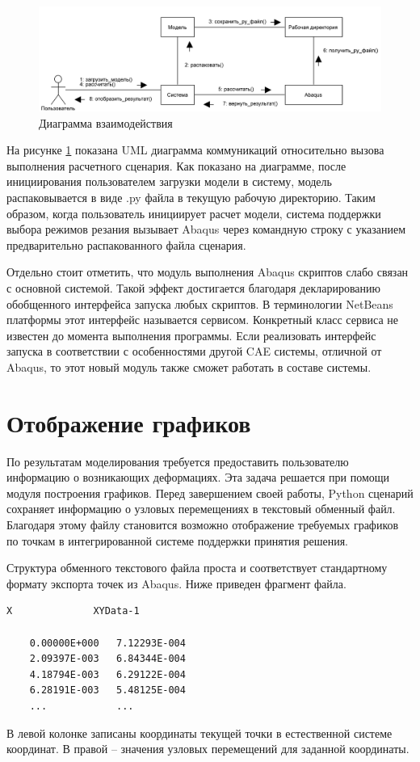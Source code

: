 \documentclass[14pt,oneside,final]{extreport}
\begin{document}
	\begin{figure}[!h]
		\begin{center}
			\includegraphics[width=1\textwidth]{img/commun-diagram} 
		\end{center}
		\caption{Диаграмма взаимодействия}
		\label{fig:commun-diagram}
	\end{figure}
	
	На рисунке \ref{fig:commun-diagram} показана UML диаграмма коммуникаций относительно вызова выполнения расчетного сценария. Как показано на диаграмме, после инициирования пользователем загрузки модели в систему, модель распаковывается в виде .py файла в текущую рабочую директорию. Таким образом, когда пользователь инициирует расчет модели, система поддержки выбора режимов резания вызывает Abaqus через командную строку с указанием предварительно распакованного файла сценария.
	
	Отдельно стоит отметить, что модуль выполнения Abaqus скриптов слабо связан с основной системой. Такой эффект достигается благодаря декларированию обобщенного интерфейса запуска любых скриптов. В терминологии NetBeans платформы этот интерфейс называется сервисом. Конкретный класс сервиса не известен до момента выполнения программы. Если реализовать интерфейс запуска в соответствии с особенностями другой CAE системы, отличной от Abaqus, то этот новый модуль также сможет работать в составе системы. 
	
	
	\section{Отображение графиков}	
	По результатам моделирования требуется предоставить пользователю информацию о возникающих деформациях. Эта задача решается при помощи модуля построения графиков. Перед завершением своей работы, Python сценарий сохраняет информацию о узловых перемещениях в текстовый обменный файл. Благодаря этому файлу становится возможно отображение требуемых графиков по точкам в интегрированной системе поддержки принятия решения.
	
	Структура обменного текстового файла проста и соответствует стандартному формату экспорта точек из Abaqus. Ниже приведен фрагмент файла. 
	\begin{lstlisting}[style=nonumbers]
	X              XYData-1
	
	0.00000E+000   7.12293E-004
	2.09397E-003   6.84344E-004
	4.18794E-003   6.29122E-004
	6.28191E-003   5.48125E-004
	... 		   ...
	\end{lstlisting}
	В левой колонке записаны координаты текущей точки в естественной системе координат. В правой -- значения узловых перемещений для заданной координаты.
		 
\end{document}
